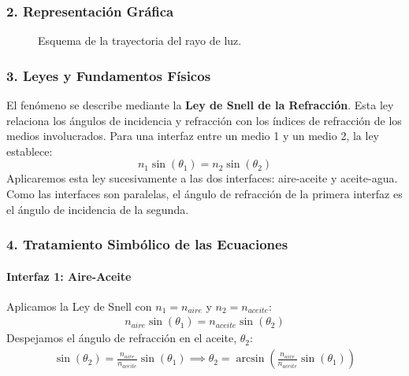 \subsubsection*{2. Representación Gráfica}
\begin{figure}[H]
    \centering
    \caption{Esquema de la trayectoria del rayo de luz.}
\end{figure}

\subsubsection*{3. Leyes y Fundamentos Físicos}
El fenómeno se describe mediante la \textbf{Ley de Snell de la Refracción}. Esta ley relaciona los ángulos de incidencia y refracción con los índices de refracción de los medios involucrados. Para una interfaz entre un medio 1 y un medio 2, la ley establece:
$$ n_1 \sin(\theta_1) = n_2 \sin(\theta_2) $$
Aplicaremos esta ley sucesivamente a las dos interfaces: aire-aceite y aceite-agua. Como las interfaces son paralelas, el ángulo de refracción de la primera interfaz es el ángulo de incidencia de la segunda.

\subsubsection*{4. Tratamiento Simbólico de las Ecuaciones}
\paragraph*{Interfaz 1: Aire-Aceite}
Aplicamos la Ley de Snell con $n_1=n_{aire}$ y $n_2=n_{aceite}$:
\begin{gather}
    n_{aire} \sin(\theta_1) = n_{aceite} \sin(\theta_2)
\end{gather}
Despejamos el ángulo de refracción en el aceite, $\theta_2$:
\begin{gather}
    \sin(\theta_2) = \frac{n_{aire}}{n_{aceite}} \sin(\theta_1) \implies \theta_2 = \arcsin\left(\frac{n_{aire}}{n_{aceite}} \sin(\theta_1)\right)
\end{gather}
